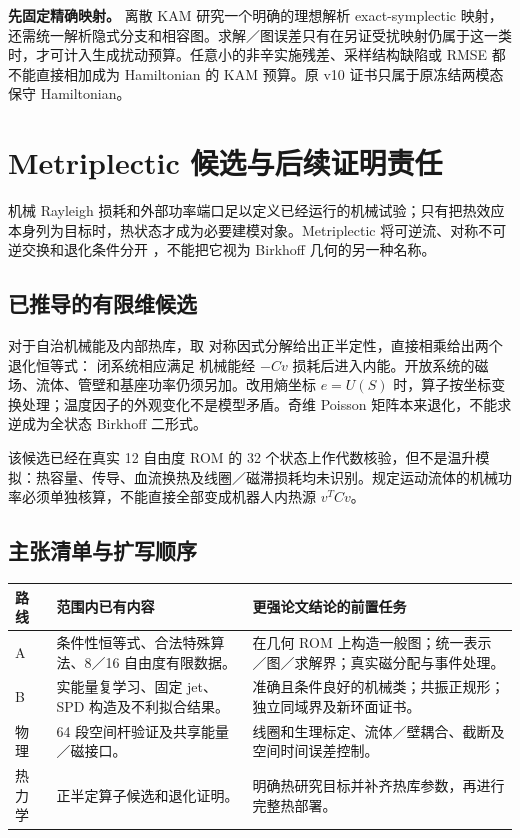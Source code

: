 \textbf{先固定精确映射。} 离散 KAM 研究一个明确的理想解析 exact-symplectic 映射，还需统一解析隐式分支和相容图。求解／图误差只有在另证受扰映射仍属于这一类时，才可计入生成扰动预算。任意小的非辛实施残差、采样结构缺陷或 RMSE 都不能直接相加成为 Hamiltonian 的 KAM 预算。原 v10 证书只属于原冻结两模态保守 Hamiltonian。

\PaperPage
\section{Metriplectic 候选与后续证明责任}
机械 Rayleigh 损耗和外部功率端口足以定义已经运行的机械试验；只有把热效应本身列为目标时，热状态才成为必要建模对象。Metriplectic 将可逆流、对称不可逆交换和退化条件分开 \citep{coquinot2020}，不能把它视为 Birkhoff 几何的另一种名称。

\subsection{已推导的有限维候选}
对于自治机械能及内部热库，取
\EqThermalState
\EqMetriplecticMatrices
对称因式分解给出正半定性，直接相乘给出两个退化恒等式：
\EqDegeneracy
闭系统相应满足
\EqThermalBalance
机械能经 $-Cv$ 损耗后进入内能。开放系统的磁场、流体、管壁和基座功率仍须另加。改用熵坐标 $e=U(S)$ 时，算子按坐标变换处理；温度因子的外观变化不是模型矛盾。奇维 Poisson 矩阵本来退化，不能求逆成为全状态 Birkhoff 二形式。

该候选已经在真实 12 自由度 ROM 的 32 个状态上作代数核验，但不是温升模拟：热容量、传导、血流换热及线圈／磁滞损耗均未识别。规定运动流体的机械功率必须单独核算，不能直接全部变成机器人内热源 $v^TCv$。

\subsection{主张清单与扩写顺序}
\begin{tabularx}{\textwidth}{@{}P{.14\textwidth}P{.23\textwidth}X@{}}
\toprule
路线 & 范围内已有内容 & 更强论文结论的前置任务\\
\midrule
A & 条件性恒等式、合法特殊算法、8／16 自由度有限数据。 & 在几何 ROM 上构造一般图；统一表示／图／求解界；真实磁分配与事件处理。\\
B & 实能量复学习、固定 jet、SPD 构造及不利拟合结果。 & 准确且条件良好的机械类；共振正规形；独立同域界及新环面证书。\\
物理 & 64 段空间杆验证及共享能量／磁接口。 & 线圈和生理标定、流体／壁耦合、截断及空间时间误差控制。\\
热力学 & 正半定算子候选和退化证明。 & 明确热研究目标并补齐热库参数，再进行完整热部署。\\
\bottomrule
\end{tabularx}

